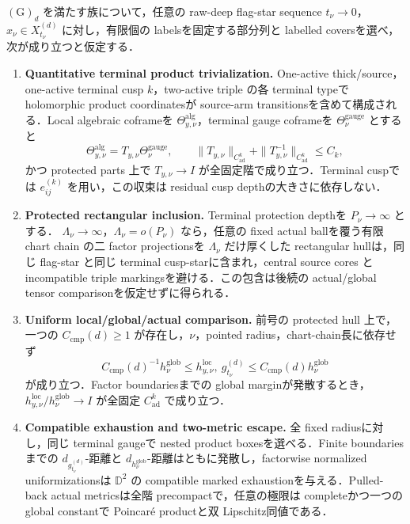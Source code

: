 \documentclass[a4paper,11pt]{ltjsarticle}
\numberwithin{equation}{section}
\theoremstyle{plain}
\theoremstyle{definition}
\theoremstyle{remark}
\begin{document}
\begin{assumption}\label{ass:PBEd}
$\mathrm{(G)}_d$ を満たす族について，任意の raw-deep flag-star sequence
$t_\nu\to0$，$x_\nu\in X_{t_\nu}^{(d)}$ に対し，有限個の labelsを固定する部分列と labelled coversを選べ，次が成り立つと仮定する．
\begin{enumerate}[label=\textup{(PBE$_d$\arabic*)}]
\item \textbf{Quantitative terminal product trivialization.}
      One-active thick/source，one-active terminal cusp $k$，two-active triple の各 terminal typeで holomorphic product coordinatesが source-arm transitionsを含めて構成される．Local algebraic coframeを $\Theta^{\mathrm{alg}}_{y,\nu}$，terminal gauge coframeを $\Theta^{\mathrm{gauge}}_\nu$ とすると
      \[
       \Theta^{\mathrm{alg}}_{y,\nu}
       =T_{y,\nu}\Theta^{\mathrm{gauge}}_\nu,
       \qquad
       \|T_{y,\nu}\|_{C^k_{\mathrm{ad}}}
       +\|T_{y,\nu}^{-1}\|_{C^k_{\mathrm{ad}}}\le C_k,
      \]
      かつ protected parts 上で $T_{y,\nu}\to I$ が全固定階で成り立つ．Terminal cuspでは $e_{ij}^{(k)}$ を用い，この収束は residual cusp depthの大きさに依存しない．
\item \textbf{Protected rectangular inclusion.}
      Terminal protection depthを $P_\nu\to\infty$ とする．
      $\Lambda_\nu\to\infty$，$\Lambda_\nu=o(P_\nu)$ なら，任意の fixed actual ballを覆う有限 chart chain の二 factor projectionsを $\Lambda_\nu$ だけ厚くした rectangular hullは，同じ flag-star と同じ terminal cusp-starに含まれ，central source cores と incompatible triple markingsを避ける．この包含は後続の actual/global tensor comparisonを仮定せずに得られる．
\item \textbf{Uniform local/global/actual comparison.}
      前号の protected hull 上で，一つの $C_{\mathrm{cmp}}(d)\ge1$ が存在し，$\nu$，pointed radius，chart-chain長に依存せず
      \[
       C_{\mathrm{cmp}}(d)^{-1}h_\nu^{\mathrm{glob}}
       \le h_{y,\nu}^{\mathrm{loc}},\ g_{t_\nu}^{(d)}
       \le C_{\mathrm{cmp}}(d)h_\nu^{\mathrm{glob}}
      \]
      が成り立つ．Factor boundariesまでの global marginが発散するとき，
      $h_{y,\nu}^{\mathrm{loc}}/h_\nu^{\mathrm{glob}}\to I$ が全固定 $C^k_{\mathrm{ad}}$ で成り立つ．
\item \textbf{Compatible exhaustion and two-metric escape.}
      全 fixed radiusに対し，同じ terminal gaugeで nested product boxesを選べる．Finite boundariesまでの
      $d_{g_{t_\nu}^{(d)}}$-距離と $d_{h_\nu^{\mathrm{glob}}}$-距離はともに発散し，factorwise normalized uniformizationsは $\mathbb D^2$ の compatible marked exhaustionを与える．Pulled-back actual metricsは全階 precompactで，任意の極限は completeかつ一つの global constantで Poincaré productと双 Lipschitz同値である．
\end{enumerate}
\end{assumption}
\end{document}
